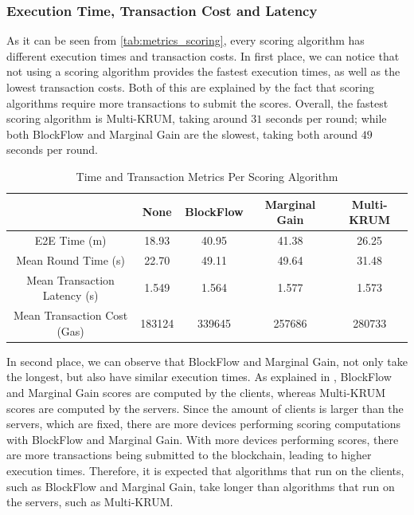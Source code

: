 \subsubsection{Execution Time, Transaction Cost and Latency}

As it can be seen from \autoref{tab:metrics_scoring}, every scoring algorithm has different execution times and transaction costs. In first place, we can notice that not using a scoring algorithm provides the fastest execution times, as well as the lowest transaction costs. Both of this are explained by the fact that scoring algorithms require more transactions to submit the scores. Overall, the fastest scoring algorithm is Multi-KRUM, taking around $31$ seconds per round; while both BlockFlow and Marginal Gain are the slowest, taking both around $49$ seconds per round.

\begin{table}[!ht]
\centering
\begin{tabular}{c|c|c|c|c} \hline \hline
                               & None   & BlockFlow & Marginal Gain & Multi-KRUM \\ \hline \hline
E2E Time (m)                   & 18.93  & 40.95     & 41.38         & 26.25      \\ \hline
Mean Round Time (s)            & 22.70  & 49.11     & 49.64         & 31.48      \\ \hline
Mean Transaction Latency (s)   & 1.549  & 1.564     & 1.577         & 1.573      \\ \hline
Mean Transaction Cost (Gas)    & 183124 & 339645    & 257686        & 280733     \\ \hline
\end{tabular}
\caption{Time and Transaction Metrics Per Scoring Algorithm}
\label{tab:metrics_scoring}
\end{table}

In second place, we can observe that BlockFlow and Marginal Gain, not only take the longest, but also have similar execution times. As explained in , BlockFlow and Marginal Gain scores are computed by the clients, whereas Multi-KRUM scores are computed by the servers. Since the amount of clients is larger than the servers, which are fixed, there are more devices performing scoring computations with BlockFlow and Marginal Gain. With more devices performing scores, there are more transactions being submitted to the blockchain, leading to higher execution times. Therefore, it is expected that algorithms that run on the clients, such as BlockFlow and Marginal Gain, take longer than algorithms that run on the servers, such as Multi-KRUM.

